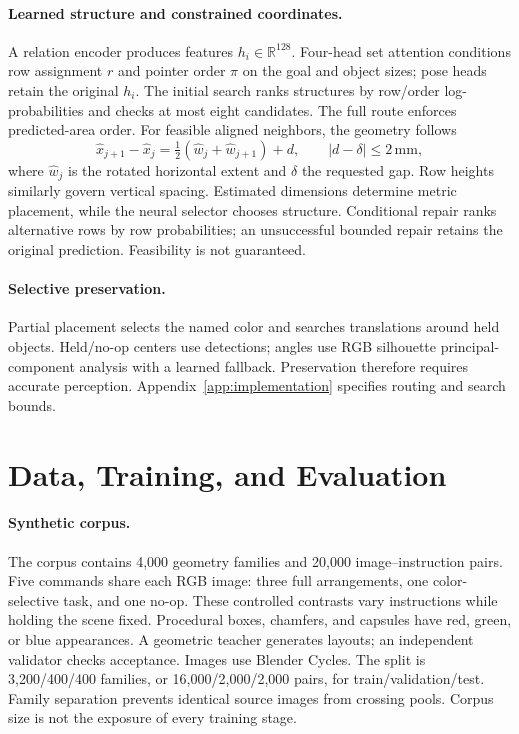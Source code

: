\documentclass{article}
\begin{document}
\paragraph{Learned structure and constrained coordinates.}
A relation encoder produces features $h_i\in\mathbb R^{128}$. Four-head set attention conditions row assignment $r$ and pointer order $\pi$ on the goal and object sizes; pose heads retain the original $h_i$. The initial search ranks structures by row/order log-probabilities and checks at most eight candidates. The full route enforces predicted-area order. For feasible aligned neighbors, the geometry follows
\begin{equation}\label{eq:mainspacing}
 \hat x_{j+1}-\hat x_j=\tfrac12(\hat w_j+\hat w_{j+1})+d,\qquad |d-\delta|\leq2\,\mathrm{mm},
\end{equation}
where $\hat w_j$ is the rotated horizontal extent and $\delta$ the requested gap. Row heights similarly govern vertical spacing. Estimated dimensions determine metric placement, while the neural selector chooses structure. Conditional repair ranks alternative rows by row probabilities; an unsuccessful bounded repair retains the original prediction. Feasibility is not guaranteed.

\paragraph{Selective preservation.}
Partial placement selects the named color and searches translations around held objects. Held/no-op centers use detections; angles use RGB silhouette principal-component analysis with a learned fallback. Preservation therefore requires accurate perception. Appendix~\ref{app:implementation} specifies routing and search bounds.

\clearpage
\section{Data, Training, and Evaluation}
\label{sec:protocol}
\paragraph{Synthetic corpus.}
The corpus contains 4,000 geometry families and 20,000 image--instruction pairs. Five commands share each RGB image: three full arrangements, one color-selective task, and one no-op. These controlled contrasts vary instructions while holding the scene fixed. Procedural boxes, chamfers, and capsules have red, green, or blue appearances. A geometric teacher generates layouts; an independent validator checks acceptance. Images use Blender Cycles. The split is 3,200/400/400 families, or 16,000/2,000/2,000 pairs, for train/validation/test. Family separation prevents identical source images from crossing pools. Corpus size is not the exposure of every training stage.
\end{document}
